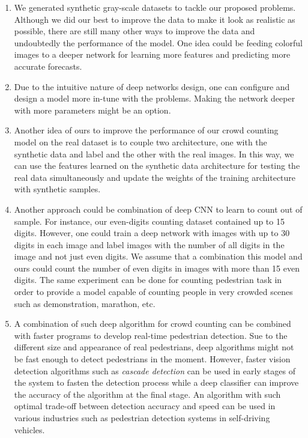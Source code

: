 \begin{enumerate}
\item We generated synthetic gray-scale datasets to tackle our proposed problems. Although we did our best to improve the data to make it look as realistic as possible, there are still many other ways to improve the data and undoubtedly the performance of the model. One idea could be feeding colorful images to a deeper network for learning more features and predicting more accurate forecasts.   
\item Due to the intuitive nature of deep networks design, one can configure and design a model more in-tune with the problems. Making the network deeper with more parameters might be an option.
\item Another idea of ours to improve the performance of our crowd counting model on the real dataset is to couple two architecture, one with the synthetic data and label and the other with the real images. In this way, we can use the features learned on the synthetic data architecture for testing the real data simultaneously and update the weights of the training architecture with synthetic samples. 
\item Another approach could be combination of deep CNN to learn to count out of sample. For instance, our even-digits counting dataset contained up to 15 digits. However, one could train a deep network with images with up to 30 digits in each image and label images with the number of all digits in the image and not just even digits. We assume that a combination this model and ours could count the number of even digits in images with more than 15 even digits. The same experiment can be done for counting pedestrian task in order to provide a model capable of counting people in very crowded scenes such as demonstration, marathon, etc. 
\item A combination of such deep algorithm for crowd counting can be combined with faster programs to develop real-time pedestrian detection. Sue to the different size and appearance of real pedestrians, deep algorithms might not be fast enough to detect pedestrians in the moment. However, faster vision detection algorithms such as \textit{cascade detection} can be used in early stages of the system to fasten the detection  process while a deep classifier can improve the accuracy of the algorithm at the final stage. An algorithm with such optimal trade-off between detection accuracy and speed can be used in various industries such as pedestrian detection systems in self-driving vehicles. 
\end{enumerate}  


